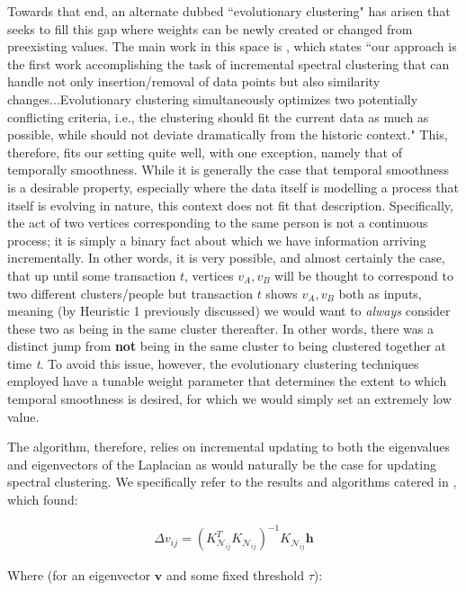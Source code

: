 \documentclass[journal]{IEEEtran}
\begin{document}
Towards that end, an alternate dubbed ``evolutionary clustering" has arisen that seeks to fill this gap where weights can be newly created or changed from preexisting values. The main work in this space is \cite{incremental}, which states ``our approach is the first work accomplishing the task of incremental spectral clustering that can handle not only insertion/removal of data points but also similarity changes...Evolutionary clustering simultaneously optimizes two potentially conflicting criteria, i.e., the clustering should fit the current data as much as possible, while should not deviate dramatically from the historic context." This, therefore, fits our setting quite well, with one exception, namely that of temporally smoothness. While it is generally the case that temporal smoothness is a desirable property, especially where the data itself is modelling a process that itself is evolving in nature, this context does not fit that description. Specifically, the act of two vertices corresponding to the same person is not a continuous process; it is simply a binary fact about which we have information arriving incrementally. In other words, it is very possible, and almost certainly the case, that up until some transaction $t$, vertices $v_A,v_B$ will be thought to correspond to two different clusters/people but transaction $t$ shows $v_A,v_B$ both as inputs, meaning (by Heuristic 1 previously discussed) we would want to \textit{always} consider these two as being in the same cluster thereafter. In other words, there was a distinct jump from \textbf{not} being in the same cluster to being clustered together at time \textit{t}. To avoid this issue, however, the evolutionary clustering techniques employed have a tunable weight parameter that determines the extent to which temporal smoothness is desired, for which we would simply set an extremely low value.

The algorithm, therefore, relies on incremental updating to both the eigenvalues and eigenvectors of the Laplacian as would naturally be the case for updating spectral clustering. We specifically refer to the results and algorithms catered in \cite{incremental}, which found:

\begin{align}
    \Delta v_{ij} = (K^T_{\mathcal{N}_{ij}} K_{\mathcal{N}_{ij}})^{-1} K_{\mathcal{N}_{ij}} \textbf{h}\label{eq:delta-v}
\end{align}

Where (for an eigenvector $\textbf{v}$ and some fixed threshold $\tau$):
\end{document}
